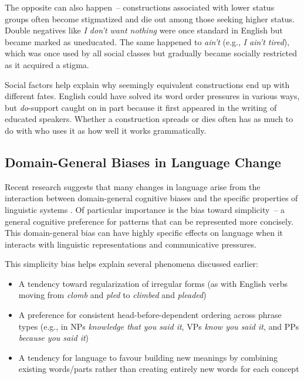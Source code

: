 The opposite can also happen~-- constructions associated with lower status groups often become stigmatized and die out among those seeking higher status. Double negatives like \textit{I don't want nothing} were once standard in English but became marked as uneducated. The same happened to \textit{ain't} (e.g., \textit{I ain't tired}), which was once used by all social classes but gradually became socially restricted as it acquired a stigma.

Social factors help explain why seemingly equivalent constructions end up with different fates. English could have solved its word order pressures in various ways, but \textit{do}-support caught on in part because it first appeared in the writing of educated speakers. Whether a construction spreads or dies often has as much to do with who uses it as how well it works grammatically.

\subsection{Domain-General Biases in Language Change}

Recent research suggests that many changes in language arise from the interaction between domain-general cognitive biases and the specific properties of linguistic systems \citep{culbertson2016simplicity}. Of particular importance is the bias toward simplicity~-- a general cognitive preference for patterns that can be represented more concisely. This domain-general bias can have highly specific effects on language when it interacts with linguistic representations and communicative pressures.

This simplicity bias helps explain several phenomena discussed earlier:
\begin{itemize}[noitemsep]
    \item A tendency toward regularization of irregular forms (as with English verbs moving from \textit{clomb} and \textit{pled} to \textit{climbed} and \textit{pleaded})
    \item A preference for consistent head-before-dependent ordering across phrase types (e.g., in NPs \textit{knowledge {\ob}that you said it{\cb}}, VPs \textit{know {\ob}you said it{\cb}}, and PPs \textit{because {\ob}you said it{\cb}})
    \item A tendency for language to favour building new meanings by combining existing words/parts rather than creating entirely new words for each concept
\end{itemize}

